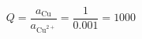 \documentclass[preview]{standalone}
\begin{document}
\[Q = \frac{a_{\text{Cu}}}{a_{\text{Cu}^{2+}}} = \frac{1}{0.001} = 1000\]
\end{document}
